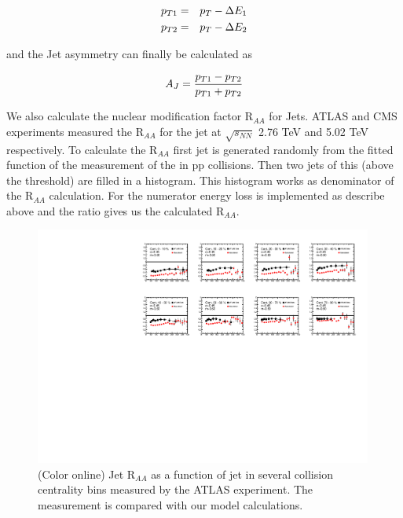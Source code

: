\documentclass[reprint,amsmath,amssymb,aps,showpacs,showkeys]{revtex4}
\begin{document}
 \begin{eqnarray}
   p_{T1} &= & p_{T} - \Delta E_1 \nonumber \\
   p_{T2} &= & p_{T} - \Delta E_2 \nonumber   
 \end{eqnarray}

 and the Jet asymmetry can finally be calculated as

\begin{equation}
  A_{J} = \frac{p_{T1}-p_{T2}}{p_{T1}+p_{T2}} \\
\end{equation}
 

We also calculate the nuclear modification factor R$_{AA}$ for Jets. ATLAS and CMS experiments
measured the R$_{AA}$ for the jet at $\sqrt{s_{NN}}$ 2.76 TeV and 5.02 TeV respectively.
To calculate the R$_{AA}$ first jet \pt is generated randomly from the fitted function of the
measurement of the \pt in pp collisions. Then two jets of this \pt (above the threshold) are
filled in a histogram. This histogram works as denominator of the R$_{AA}$ calculation. For the
numerator energy loss is implemented as describe above and the ratio gives us the calculated R$_{AA}$.




\begin{figure}
  \includegraphics[width=0.99\textwidth]{Figures/Fig_RAA_Jet_Centrality_276TeV.pdf}
  \caption{(Color online) Jet R$_{AA}$ as  a function of jet \pt in several collision centrality bins
    measured by the ATLAS experiment. The measurement is compared with our model calculations.}
  \label{Fig:JetRAAPt_ATLAS_276TeV}
\end{figure}
\end{document}
